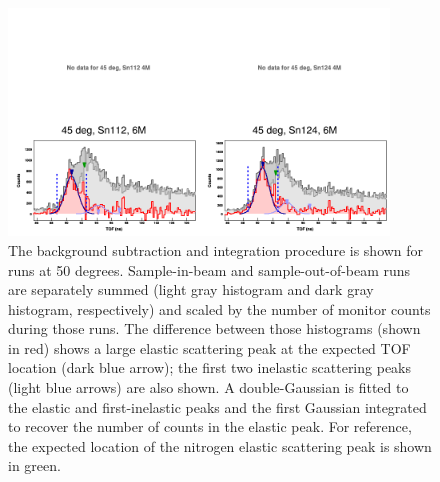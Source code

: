\begin{figure}
    \includegraphics[width = 0.9\textwidth]{figures/tiledAngleData.png}
    \caption{The background subtraction and integration procedure is shown for
        runs at 50 degrees. Sample-in-beam and sample-out-of-beam runs are
        separately summed (light gray histogram and dark gray histogram,
        respectively) and scaled by the number of monitor counts during those
        runs. The difference between those histograms (shown in red) shows a
        large elastic scattering peak at the expected TOF location (dark blue
        arrow); the first two inelastic scattering peaks (light blue arrows) are
        also shown. A double-Gaussian is fitted to the elastic and
        first-inelastic peaks and the first Gaussian integrated to recover the
        number of counts in the elastic peak. For reference, the expected location
        of the nitrogen elastic scattering peak is shown in green.}
        \label{tiledAngleData}
\end{figure}

